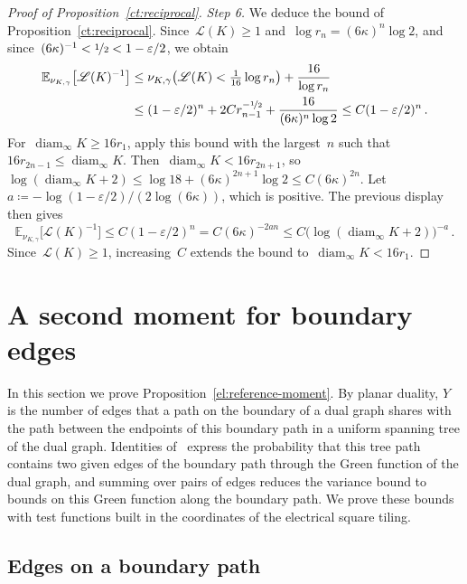 \documentclass[11pt]{amsart}
\numberwithin{equation}{section}
\newcommand{\EE}{\mathbb E}
\newcommand{\nf}{\nicefrac}
\newcommand{\cL}{\mathscr{L}}
\DeclareMathOperator{\diam}{diam}
\begin{document}
\begin{proof}[Proof of Proposition~\ref{ct:reciprocal}]
\emph{Step 6.} We deduce the bound of Proposition~\ref{ct:reciprocal}. Since~$\cL(K)\geq1$ and~$\log r_n=(6\kappa)^n\log2$, and since~$(6\kappa)^{-1}<\nf12<1-\varepsilon/2$, we obtain
\begin{equation*}
\begin{split}
\EE_{\nu_{K,\gamma}}\bigl[\cL(K)^{-1}\bigr]&\leq\nu_{K,\gamma}\bigl(\cL(K)<\tfrac1{16}\log r_n\bigr)+\frac{16}{\log r_n}\\
&\leq(1-\varepsilon/2)^n+2Cr_{n-1}^{-\nf12}+\frac{16}{(6\kappa)^n\log2}\leq C(1-\varepsilon/2)^n\,.
\end{split}
\end{equation*}
For~$\diam_\infty K\geq16r_1$, apply this bound with the largest~$n$ such that~$16r_{2n-1}\leq\diam_\infty K$. Then~$\diam_\infty K<16r_{2n+1}$, so~$\log(\diam_\infty K+2)\leq\log18+(6\kappa)^{2n+1}\log2\leq C(6\kappa)^{2n}$. Let~$a\coloneqq-\log(1-\varepsilon/2)/(2\log(6\kappa))$, which is positive. The previous display then gives
\begin{equation*}
\EE_{\nu_{K,\gamma}}\bigl[\cL(K)^{-1}\bigr]\leq C(1-\varepsilon/2)^n=C(6\kappa)^{-2an}\leq C\bigl(\log(\diam_\infty K+2)\bigr)^{-a}\,.
\end{equation*}
Since~$\cL(K)\geq1$, increasing~$C$ extends the bound to~$\diam_\infty K<16r_1$.
\end{proof}

\section{A second moment for boundary edges}\label{sec:electrical}

In this section we prove Proposition~\ref{el:reference-moment}. By planar duality, $Y$ is the number of edges that a path on the boundary of a dual graph shares with the path between the endpoints of this boundary path in a uniform spanning tree of the dual graph. Identities of~\citet*{KenyonWilson2009} express the probability that this tree path contains two given edges of the boundary path through the Green function of the dual graph, and summing over pairs of edges reduces the variance bound to bounds on this Green function along the boundary path. We prove these bounds with test functions built in the coordinates of the electrical square tiling.

\subsection{Edges on a boundary path}\label{ssec:boundary-path}
\end{document}
